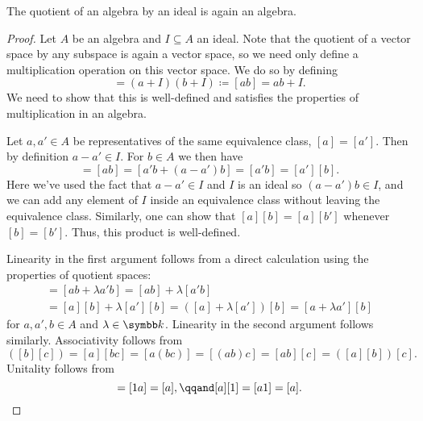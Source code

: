 \begin{lma}{}{}
    The quotient of an algebra by an ideal is again an algebra.
    \begin{proof}
        Let \(A\) be an algebra and \(I \subseteq A\) an ideal.
        Note that the quotient of a vector space by any subspace is again a vector space, so we need only define a multiplication operation on this vector space.
        We do so by defining
        \begin{equation}
            [a][b] = (a + I)(b + I) \coloneq [ab] = ab + I.
        \end{equation}
        We need to show that this is well-defined and satisfies the properties of multiplication in an algebra.
        
        Let \(a, a' \in A\) be representatives of the same equivalence class, \([a] = [a']\).
        Then by definition \(a - a' \in I\).
        For \(b \in A\) we then have
        \begin{equation}
            [a][b] = [ab] = [a'b + (a - a')b] = [a'b] = [a'][b].
        \end{equation}
        Here we've used the fact that \(a - a' \in I\) and \(I\) is an ideal so \((a - a')b \in I\), and we can add any element of \(I\) inside an equivalence class without leaving the equivalence class.
        Similarly, one can show that \([a][b] = [a][b']\) whenever \([b] = [b']\).
        Thus, this product is well-defined.
        
        Linearity in the first argument follows from a direct calculation using the properties of quotient spaces:
        \begin{multline}
            [(a + \lambda a')b] = [a b + \lambda a' b] = [ab] + \lambda [a' b]\\
            = [a][b] + \lambda [a'][b]= ([a] + \lambda[a'])[b] = [a + \lambda a'][b]
        \end{multline}
        for \(a, a', b \in A\) and \(\lambda \in \field\).
        Linearity in the second argument follows similarly.
        Associativity follows from
        \begin{equation}
            [a]([b][c]) = [a][bc] = [a(bc)] = [(ab)c] = [ab][c] = ([a][b])[c].
        \end{equation}
        Unitality follows from
        \begin{equation}
            [1][a] = [1a] = [a], \qqand [a][1] = [a1] = [a].
        \end{equation}
    \end{proof}
\end{lma}

